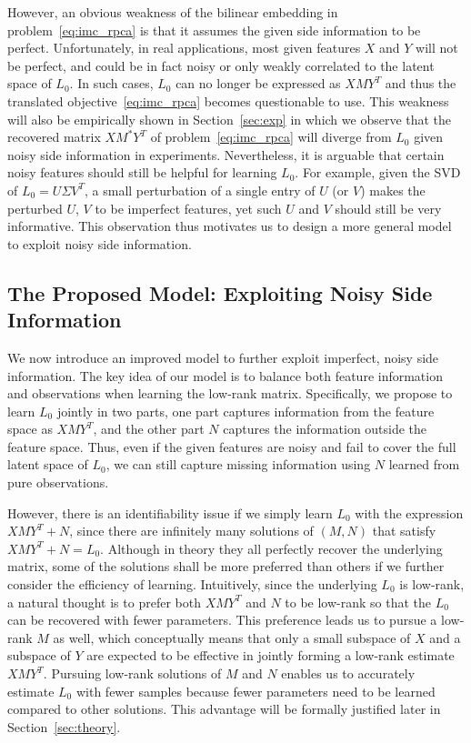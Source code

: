 \documentclass[twoside,11pt]{article}
\def\realL{L_0}
\def\optM{M^*}
\begin{document}
However, an obvious weakness of the bilinear embedding in problem~\eqref{eq:imc_rpca}
is that it assumes the given side information to be perfect.  Unfortunately,
in real applications, most given features $X$ and $Y$ will not be perfect, and could be in fact
noisy or only weakly correlated to the latent space of $\realL$.  In such
cases, $\realL$ can no longer be expressed as $XMY^T$ and thus
the translated objective~\eqref{eq:imc_rpca} becomes questionable to use.
This weakness will also be empirically shown in Section~\ref{sec:exp}
in which we observe that the recovered matrix $X\optM Y^T$ of problem~\eqref{eq:imc_rpca}
will diverge
from $\realL$ given noisy side information in experiments.
Nevertheless, it is arguable that certain noisy features should still be helpful
for learning $\realL$.
For example, given the SVD of $\realL = U\Sigma V^T$,
a small perturbation of a single entry of $U$ (or $V$) makes the perturbed $U$, $V$ to be
imperfect features,
yet such $U$ and $V$ should still be very informative.
This observation thus motivates us to design a more general model to
exploit noisy side information.

\subsection{The Proposed Model: Exploiting Noisy Side Information}
\label{subsec:propose}
We now introduce an improved model to further exploit imperfect, noisy side information.
The key idea of our model is to
balance both feature information and observations when learning the low-rank matrix.
Specifically, we propose to learn $\realL$ jointly in two parts,
one part captures information from the feature space as $XMY^T$, and the other part $N$
captures the information outside the feature space.  Thus, even if the given features are noisy
and fail to cover the full latent space of $\realL$, we can still capture missing information
using $N$ learned from pure observations.

However, there is an identifiability issue if we simply learn $\realL$ with the
expression $XMY^T + N$, since
there are infinitely many solutions of $(M, N)$ that satisfy $XMY^T+N = \realL$.
Although in theory they all perfectly recover the underlying matrix,
some of the solutions shall be more preferred than others if we further consider
the efficiency of learning.  Intuitively,
since the underlying $\realL$ is low-rank, a natural thought is to prefer
both $XMY^T$ and $N$ to be low-rank so that the $\realL$ can be recovered with fewer parameters.
This preference leads us to pursue a low-rank $M$ as well, which conceptually means that
only a small subspace of $X$ and a subspace of $Y$ are expected to be effective
in jointly forming a low-rank estimate $XMY^T$.  Pursuing
low-rank solutions of $M$ and $N$ enables us to accurately estimate $\realL$
with fewer samples because fewer parameters need to be learned compared to other solutions.
This advantage will be formally justified later in Section~\ref{sec:theory}.
\end{document}
